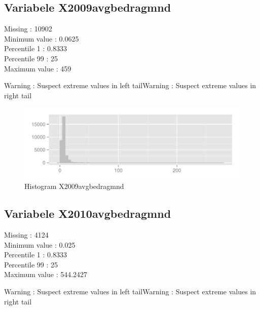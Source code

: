 \documentclass[10pt,a4paper,titlepage]{report}
\begin{document}

\subsection{Variabele X2009avgbedragmnd}

Missing :  10902 \\
Minimum value : 0.0625\\
Percentile 1 : 0.8333\\
Percentile 99 : 25\\
Maximum value : 459

\color{red}
Warning : Suspect extreme values in left tailWarning : Suspect extreme values in right tail

\color{black}

\begin{figure}[H]
   \centering
\begin{knitrout}
\color{fgcolor}
\includegraphics[width=\maxwidth]{figure/unnamed-chunk-14} 

\end{knitrout}

    \caption{Histogram X2009avgbedragmnd}
    \label{fig:figPlot7}
\end{figure}


\subsection{Variabele X2010avgbedragmnd}

Missing :  4124 \\
Minimum value : 0.025\\
Percentile 1 : 0.8333\\
Percentile 99 : 25\\
Maximum value : 544.2427

\color{red}
Warning : Suspect extreme values in left tailWarning : Suspect extreme values in right tail
\end{document}
